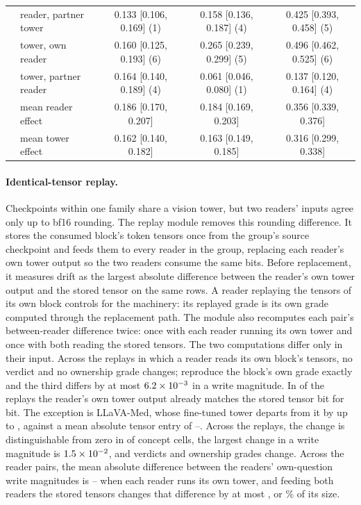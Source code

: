 \documentclass{article}
\begin{document}
\begin{table}[htbp]
{\begin{tabular}{llccc}
 & reader, partner tower & 0.133 [0.106, 0.169] (1) & 0.158 [0.136, 0.187] (4) & 0.425 [0.393, 0.458] (5) \\
 & tower, own reader & 0.160 [0.125, 0.193] (6) & 0.265 [0.239, 0.299] (5) & 0.496 [0.462, 0.525] (6) \\
 & tower, partner reader & 0.164 [0.140, 0.189] (4) & 0.061 [0.046, 0.080] (1) & 0.137 [0.120, 0.164] (4) \\
 & \quad mean reader effect & 0.186 [0.170, 0.207] & 0.184 [0.169, 0.203] & 0.356 [0.339, 0.376] \\
 & \quad mean tower effect & 0.162 [0.140, 0.182] & 0.163 [0.149, 0.185] & 0.316 [0.299, 0.338] \\
\bottomrule
\end{tabular}}
\end{table}

\paragraph{Identical-tensor replay.} Checkpoints within one family share a vision tower, but two readers' inputs agree only up to bf16 rounding. The replay module removes this rounding difference. It stores the consumed block's token tensors once from the group's source checkpoint and feeds them to every reader in the group, replacing each reader's own tower output so the two readers consume the same bits. Before replacement, it measures drift as the largest absolute difference between the reader's own tower output and the stored tensor on the same rows. A reader replaying the tensors of its own block controls for the machinery: its replayed grade is its own grade computed through the replacement path. The module also recomputes each pair's between-reader difference twice: once with each reader running its own tower and once with both reading the stored tensors. The two computations differ only in their input. Across the \cfReplaySelf{} replays in which a reader reads its own block's tensors, no verdict and no ownership grade changes; \cfReplaySelfExact{} reproduce the block's own grade exactly and the third differs by at most $6.2\times10^{-3}$ in a write magnitude. In \cfReplayDriftZero{} of the \cfReplayBlocks{} replays the reader's own tower output already matches the stored tensor bit for bit. The exception is LLaVA-Med, whose fine-tuned tower departs from it by up to \cfReplayDriftMax{}, against a mean absolute tensor entry of \cfReplayTensorMin{}--\cfReplayTensorMax{}. Across the \cfReplayBlocks{} replays, the change is distinguishable from zero in \cfReplayMoved{} of \cfReplayCells{} concept cells, the largest change in a write magnitude is $1.5\times10^{-2}$, and \cfReplayVerdictChanges{} verdicts and \cfReplayOwnedChanges{} ownership grades change. Across the \cfReplayPairs{} reader pairs, the mean absolute difference between the readers' own-question write magnitudes is \cfReplayPairOwnMin{}--\cfReplayPairOwnMax{} when each reader runs its own tower, and feeding both readers the stored tensors changes that difference by at most \cfReplayChangeMax{}, or \cfReplayRelMax\% of its size.
\end{document}
